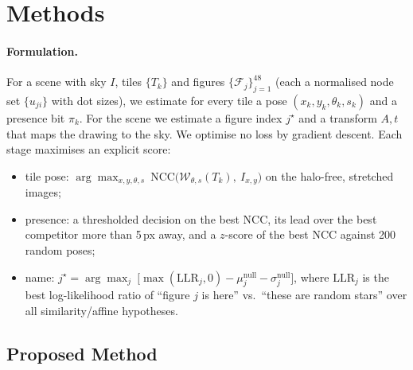 \documentclass[a4paper,11pt]{article}
\begin{document}
\section{Methods}
\label{sec:method}

\paragraph{Formulation.} For a scene with sky $I$, tiles $\{T_k\}$ and figures $\{\mathcal F_j\}_{j=1}^{48}$ (each a
normalised node set $\{u_{ji}\}$ with dot sizes), we estimate for every tile a pose $(x_k, y_k, \theta_k, s_k)$ and a
presence bit $\pi_k$. For the scene we estimate a figure index $j^\star$ and a transform $A,t$ that maps the drawing to
the sky. We optimise no loss by gradient descent. Each stage maximises an explicit score:
\begin{itemize}
\item tile pose: $\arg\max_{x,y,\theta,s}\ \mathrm{NCC}\big(\mathcal W_{\theta,s}(T_k),\ I_{x,y}\big)$ on the halo-free,
stretched images;
\item presence: a thresholded decision on the best NCC, its lead over the best competitor more than 5\,px away, and a
$z$-score of the best NCC against 200 random poses;
\item name: $j^\star = \arg\max_j\ \big[\max(\mathrm{LLR}_j,0) - \mu^{\mathrm{null}}_j - \sigma^{\mathrm{null}}_j\big]$,
where $\mathrm{LLR}_j$ is the best log-likelihood ratio of ``figure $j$ is here'' vs.\ ``these are random stars''
over all similarity/affine hypotheses.
\end{itemize}

\subsection{Proposed Method}
\end{document}
